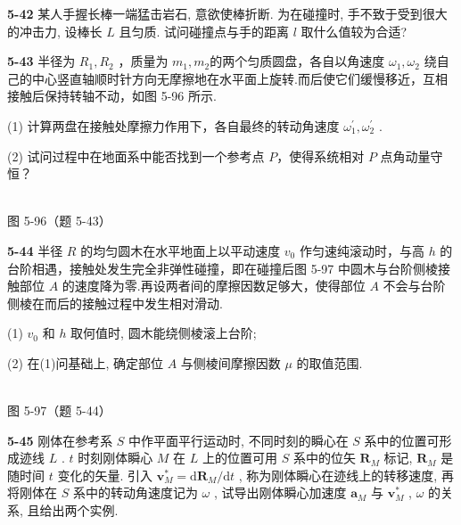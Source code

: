 \textbf{5-42} 某人手握长棒一端猛击岩石, 意欲使棒折断. 为在碰撞时, 手不致于受到很大的冲击力, 设棒长 $L$ 且匀质. 试问碰撞点与手的距离 $l$ 取什么值较为合适?

\newpage

\textbf{5-43} 半径为 $R_{1}, R_{2}$ ，质量为 $m_{1}, m_{2}$的两个匀质圆盘，各自以角速度 $\omega_{1},\omega_{2}$ 绕自己的中心竖直轴顺时针方向无摩擦地在水平面上旋转.而后使它们缓慢移近，互相接触后保持转轴不动，如图 5-96 所示.

(1) 计算两盘在接触处摩擦力作用下，各自最终的转动角速度 $\omega_{1}^{\prime}, \omega_{2}^{\prime}$ .

(2) 试问过程中在地面系中能否找到一个参考点 $P$，使得系统相对 $P$ 点角动量守恒？

\begin{center}
\resizebox{0.50\textwidth}{!}{}\\[4pt]
{\small 图 5-96（题 5-43）}
\end{center}

\newpage

\textbf{5-44} 半径 $R$ 的均匀圆木在水平地面上以平动速度 $v_{0}$ 作匀速纯滚动时，与高 $h$ 的台阶相遇，接触处发生完全非弹性碰撞，即在碰撞后图 5-97 中圆木与台阶侧棱接触部位 $A$ 的速度降为零.再设两者间的摩擦因数足够大，使得部位 $A$ 不会与台阶侧棱在而后的接触过程中发生相对滑动.

(1) $v_{0}$ 和 $h$ 取何值时, 圆木能绕侧棱滚上台阶;

(2) 在(1)问基础上, 确定部位 $A$ 与侧棱间摩擦因数 $\mu$ 的取值范围.

\begin{center}
\resizebox{0.50\textwidth}{!}{}\\[4pt]
{\small 图 5-97（题 5-44）}
\end{center}

\newpage

\textbf{5-45} 刚体在参考系 $S$ 中作平面平行运动时, 不同时刻的瞬心在 $S$ 系中的位置可形成迹线 $L$ . $t$ 时刻刚体瞬心 $M$ 在 $L$ 上的位置可用 $S$ 系中的位矢 $\mathbf{R}_M$ 标记, $\mathbf{R}_M$ 是随时间 $t$ 变化的矢量. 引入 $\pmb{v}_M^* = \mathrm{d}\pmb{R}_M / \mathrm{d}t$ , 称为刚体瞬心在迹线上的转移速度, 再将刚体在 $S$ 系中的转动角速度记为 $\omega$ , 试导出刚体瞬心加速度 $\pmb{a}_M$ 与 $\pmb{v}_M^*$ , $\omega$ 的关系, 且给出两个实例.

\newpage

